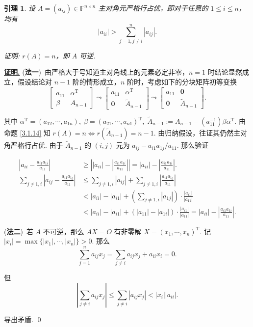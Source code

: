 \documentclass[10pt,openany]{article}
\theoremstyle{thmstyle} %
\theoremstyle{defstyle} %
\newtheorem{lemma}[theorem]{引理}
\theoremstyle{prostyle} %
\theoremstyle{exastyle}
\theoremstyle{remstyle}
\renewenvironment{proof}[1][证明]{\par\underline{\textbf{#1.}} \;\fangsong}{\qed\par}
\newcommand{\T}{^{\text{T}}}
\newcommand{\F}{\mathbb{F}}
\newcommand{\n}{^{n \times n}}
\begin{document}
\begin{lemma} \label{3.1.26}
	设 \( A = (a_{ij}) \in \F\n \) 主对角元严格行占优，即对于任意的 \( 1 \leq i \leq n \)，均有
	\[
	|a_{ii}| > \sum_{j=1, j \neq i}^{n} |a_{ij}|.
	\]
	
	证明: \( r(A)=n \)，即 \( A \) 可逆.
\end{lemma}

\begin{proof}
	(\textbf{法一})\ 由严格大于号知道主对角线上的元素必定非零，\( n=1 \) 时结论显然成立，假设结论对 \( n-1 \) 阶的情形成立，\( n \) 阶时，考虑如下的分块矩阵初等变换
	\[ \begin{bmatrix}
		a_{11} & \alpha\T \\ \beta & A_{n-1}
	\end{bmatrix} \leadsto \begin{bmatrix}
		a_{11} & \alpha\T \\ \bm{0} & \widetilde{A}_{n-1}
	\end{bmatrix} \leadsto \begin{bmatrix}
	a_{11} & \bm{0} \\ \bm{0} & \widetilde{A}_{n-1}
	\end{bmatrix}. \]
	
	其中 \( \alpha\T=(a_{12},\cdots,a_{1n}), \; \beta=(a_{21},\cdots,a_{n1})\T, \; \widetilde{A}_{n-1}:=A_{n-1}-(a_{11}^{-1})\beta\alpha\T \). 由命题 \ref{3.1.14} 知 \( r(A)=n \Leftrightarrow r(\widetilde{A}_{n-1})=n-1\). 由归纳假设，往证其仍然主对角严格行占优. 由于 \( \widetilde{A}_{n-1} \) 的 \( (i,j) \) 元为 \( a_{ij}-a_{i1}a_{1j}/a_{11} \). 那么验证
	
	\begin{align*}
		\left| a_{ii}-\frac{a_{i1}a_{1i}}{a_{11}} \right| & \geq \left| |a_{ii}|- \left| \frac{a_{i1}a_{1i}}{a_{11}} \right|\right|= |a_{ii}|- \left| \frac{a_{i1}a_{1i}}{a_{11}} \right|. \\[2ex]
		\sum_{j \neq 1,i}^{} \left| a_{ij}-\frac{a_{i1}a_{1j}}{a_{11}} \right| & \leq \sum_{j \neq 1,i}^{} \left| a_{ij}\right|+ \sum_{j \neq 1,i}^{} \left| \frac{a_{i1}a_{1j}}{a_{11}} \right| \\
		&< |a_{ii}|-|a_{i1}|+ \left( \sum_{j \neq 1,i}^{} |a_{1j}| \right) \cdot \frac{|a_{i1}|}{|a_{11}|} \\
		&< |a_{ii}|-|a_{i1}|+ (|a_{11}|-|a_{1i}|)\cdot \frac{|a_{i1}|}{|a_{11}|}= |a_{ii}|- \left| \frac{a_{i1}a_{1i}}{a_{11}} \right|.
	\end{align*}
	
	(\textbf{法二})\ 若 \( A \) 不可逆，那么 \( AX=O \) 有非零解 \( X=(x_1,\cdots,x_n)\T \). 记 \( |x_i|=\max\{ |x_1|,\cdots,|x_n|\}>0 \). 那么
	\[ \sum_{j=1}^{n} a_{ij}x_j= \sum_{j \neq i}^{} a_{ij}x_j+ a_{ii}x_i=0. \]
	
	但
	\[ \left| \sum_{j \neq i}^{} a_{ij}x_j \right| \leq \sum_{j \neq i}^{} |a_{ij}x_j| < |x_i||a_{ii}|. \]
	
	导出矛盾.
\end{proof}
\end{document}
